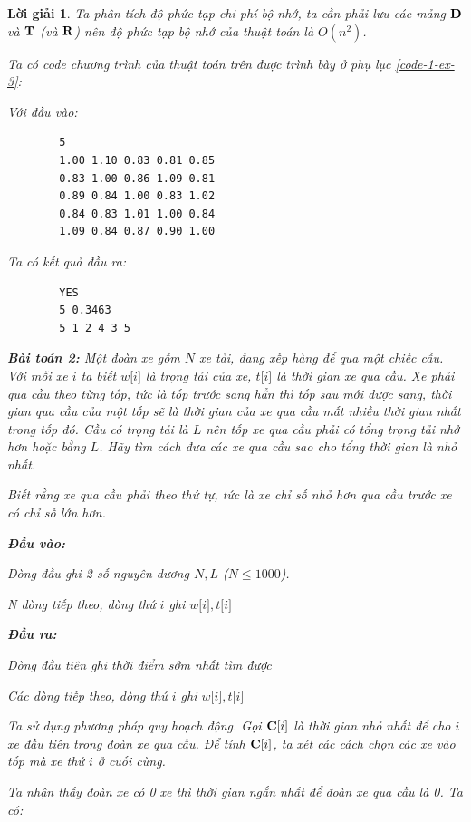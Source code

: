 \documentclass[14pt, a4paper]{article}
\theoremstyle{sltheorem}
\theoremstyle{soltheorem}
\newtheorem*{loigiai}{Lời giải}
\begin{document}
\begin{loigiai}
        Ta phân tích độ phức tạp chi phí bộ nhớ, ta cần phải lưu các mảng $\bold{D}$ và $\bold{T}$ (và $\bold{R}$) nên độ phức tạp bộ nhớ của thuật toán là $O(n^2)$.

        Ta có code chương trình của thuật toán trên được trình bày ở phụ lục \ref{code-1-ex-3}:


    Với đầu vào:
    \begin{verbatim}
        5
        1.00 1.10 0.83 0.81 0.85
        0.83 1.00 0.86 1.09 0.81
        0.89 0.84 1.00 0.83 1.02
        0.84 0.83 1.01 1.00 0.84
        1.09 0.84 0.87 0.90 1.00
    \end{verbatim}
    Ta có kết quả đầu ra:
    \begin{verbatim}
        YES
        5 0.3463
        5 1 2 4 3 5
    \end{verbatim}


    \textbf{Bài toán 2:} Một đoàn xe gồm $N$ xe tải, đang xếp hàng để qua một chiếc cầu.
    Với mỗi xe $i$ ta biết $w\lbrack i \rbrack$ là trọng tải của xe, $t\lbrack i \rbrack $ là thời gian xe qua cầu.
    Xe phải qua cầu theo từng tốp, tức là tốp trước sang hẳn thì tốp sau mới được sang,
    thời gian qua cầu của một tốp sẽ là thời gian của xe qua cầu mất nhiều thời gian nhất trong tốp đó.
    Cầu có trọng tải là $L$ nên tốp xe qua cầu phải có tổng trọng tải nhở hơn hoặc bằng $L$.
    Hãy tìm cách đưa các xe qua cầu sao cho tổng thời gian là nhỏ nhất.

    Biết rằng xe qua cầu phải theo thứ tự, tức là xe chỉ số nhỏ hơn qua cầu trước xe có chỉ số lớn hơn.

    \textbf{Đầu vào:} 
    
    Dòng đầu ghi 2 số nguyên dương $N, L$ ($N \leq 1000$). 
    
    N dòng tiếp theo, dòng thứ $i$ ghi $w \lbrack i \rbrack, t \lbrack i \rbrack$
    
    \textbf{Đầu ra:}

    Dòng đầu tiên ghi thời điểm sớm nhất tìm được
    
    Các dòng tiếp theo, dòng thứ $i$ ghi $w \lbrack i \rbrack, t \lbrack i \rbrack $

    Ta sử dụng phương pháp quy hoạch động. Gọi $\bold{C} \lbrack i \rbrack$ là thời gian nhỏ nhất để cho $i$ xe đầu tiên trong đoàn xe qua cầu.
    Để tính $\bold{C} \lbrack i \rbrack$, ta xét các cách chọn các xe vào tốp mà xe  thứ $i$ ở cuối cùng.

    Ta nhận thấy đoàn xe có 0 xe thì thời gian ngắn nhất để đoàn xe qua cầu là 0.
    Ta có:


\end{loigiai}
\end{document}
